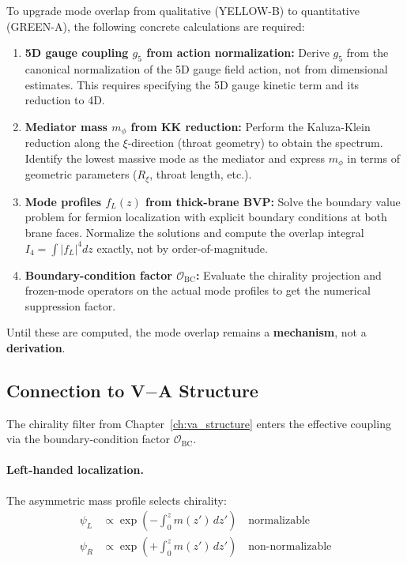 To upgrade mode overlap from qualitative (YELLOW-B) to quantitative (GREEN-A),
the following concrete calculations are required:

\begin{enumerate}[nosep]
    \item \textbf{5D gauge coupling $g_5$ from action normalization:}
          Derive $g_5$ from the canonical normalization of the 5D gauge field
          action, not from dimensional estimates. This requires specifying the
          5D gauge kinetic term and its reduction to 4D.

    \item \textbf{Mediator mass $m_\phi$ from KK reduction:}
          Perform the Kaluza-Klein reduction along the $\xi$-direction (throat
          geometry) to obtain the spectrum. Identify the lowest massive mode
          as the mediator and express $m_\phi$ in terms of geometric parameters
          ($R_\xi$, throat length, etc.).

    \item \textbf{Mode profiles $f_L(z)$ from thick-brane BVP:}
          Solve the boundary value problem for fermion localization with
          explicit boundary conditions at both brane faces. Normalize the
          solutions and compute the overlap integral $I_4 = \int |f_L|^4 dz$
          exactly, not by order-of-magnitude.

    \item \textbf{Boundary-condition factor $\mathcal{O}_{\text{BC}}$:}
          Evaluate the chirality projection and frozen-mode operators on the
          actual mode profiles to get the numerical suppression factor.
\end{enumerate}

Until these are computed, the mode overlap remains a \textbf{mechanism}, not a
\textbf{derivation}.

\subsection{\texorpdfstring{Connection to V$-$A Structure}{Connection to V-A Structure}}
\label{sec:ch11_va}

The chirality filter from Chapter~\ref{ch:va_structure} enters the effective
coupling via the boundary-condition factor $\mathcal{O}_{\text{BC}}$.

\paragraph{Left-handed localization.}
The asymmetric mass profile selects chirality:
\begin{align}
    \psi_L &\propto \exp\left(-\int_0^z m(z')\,dz'\right) \quad \text{normalizable} \\
    \psi_R &\propto \exp\left(+\int_0^z m(z')\,dz'\right) \quad \text{non-normalizable}
\end{align}

